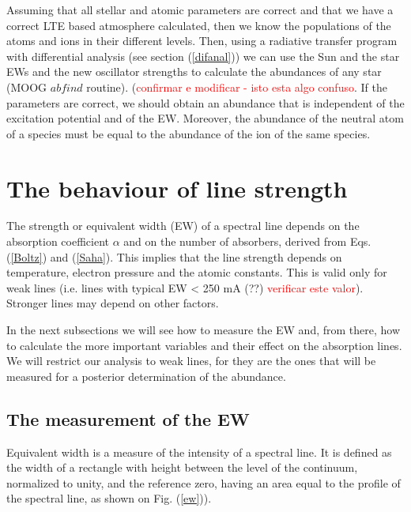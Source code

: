 \documentclass[dvips,12pt,a4paper]{report}
\begin{document}
{Assuming that all stellar and atomic parameters are correct and that we have a correct LTE based atmosphere calculated, then we know the populations of the atoms and ions in their different levels. Then, using a radiative transfer program with differential analysis (see section (\ref{difanal})) we can use the Sun and the star EWs and the new oscillator strengths to calculate the abundances of any star (MOOG $abfind$ routine). (\textcolor{red}{confirmar e modificar - isto esta algo confuso}. If the parameters are correct, we should obtain an abundance that is independent of the excitation potential and of the EW. Moreover, the abundance of the neutral atom of a species must be equal to the abundance of the ion of the same species.





\section{The behaviour of line strength}
\label{linestr}
The strength or equivalent width (EW) of a spectral line depends on the absorption coefficient $\alpha$ and on the number of absorbers, derived from Eqs. (\ref{Boltz}) and (\ref{Saha}). This implies that the line strength depends on temperature, electron pressure and the atomic constants. This is valid only for weak lines (i.e. lines with typical EW < 250 mA (??) \textcolor{red}{verificar este valor}). Stronger lines may depend on other factors. 

In the next subsections we will see how to measure the EW and, from there, how to calculate the more important variables and their effect on the absorption lines. We will restrict our analysis to weak lines, for they are the ones that will be measured for a posterior determination of the abundance.

\subsection{The measurement of the EW}

Equivalent width is a measure of the intensity of a spectral line. It is defined as the width of a rectangle with height between the level of the continuum, normalized to unity, and the reference zero, having an area equal to the profile of the spectral line, as shown on Fig. (\ref{ew})). 

}
\end{document}
